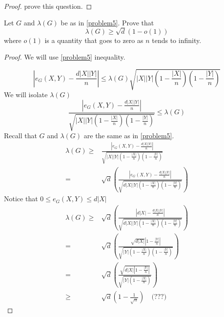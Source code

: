 \documentclass[a4paper, 11pt, oneside]{article}
\newenvironment{problem}[1]
  {\renewcommand\theinnercustomprob{#1}\innercustomprob}
  {\endinnercustomprob}
\newcommand\abs[1]{\left|#1\right|}
\begin{document}
\begin{proof}
 \cite[Lemma 8]{expander} prove this question.
\end{proof}		
 
 \begin{problem}{6}\label{problem6}
 Let $G$ and $\lambda(G)$ be as in \ref{problem5}. Prove that
 \begin{equation*}
 \lambda(G) \geq \sqrt{d}(1-o(1))
\end{equation*}
where $o(1)$ is a quantity that goes to zero as $n$ tends to infinity.
\end{problem}
\begin{proof}
We will use \ref{problem5} inequality.

\begin{equation*}
\left\lvert  e_G(X,Y) - \frac{d\abs{X}\abs{Y}}{n} \right\rvert \leq \lambda(G) \sqrt{  \abs{X}\abs{Y}  \left( 1 - \frac{\abs{X}}{n} \right)\left( 1 - \frac{\abs{Y}}{n} \right)} 
\end{equation*}
We will isolate $\lambda(G)$
\begin{equation*}
\frac{\left\lvert  e_G(X,Y) - \frac{d\abs{X}\abs{Y}}{n} \right\rvert}{\sqrt{  \abs{X}\abs{Y}  \left( 1 - \frac{\abs{X}}{n} \right)\left( 1 - \frac{\abs{Y}}{n} \right)} } \leq \lambda(G)
\end{equation*}
Recall that $G$ and $\lambda(G)$ are the same as in \ref{problem5}. 
\begin{align*}
\lambda(G) \geq &
\frac{\left\lvert  e_G(X,Y) - \frac{d\abs{X}\abs{Y}}{n} \right\rvert}{\sqrt{  \abs{X}\abs{Y}  \left( 1 - \frac{\abs{X}}{n} \right)\left( 1 - \frac{\abs{Y}}{n} \right)} }
\\ = & \sqrt{d}\left(\frac{\left\lvert  e_G(X,Y) - \frac{d\abs{X}\abs{Y}}{n} \right\rvert}{\sqrt{ d \abs{X}\abs{Y}  \left( 1 - \frac{\abs{X}}{n} \right)\left( 1 - \frac{\abs{Y}}{n} \right)} }\right)
\end{align*}
Notice that $0 \leq e_G(X,Y) \leq d \abs{X}$
\begin{align*}
\lambda(G) \geq &
\sqrt{d}\left(\frac{\left\lvert   d \abs{X} - \frac{d\abs{X}\abs{Y}}{n} \right\rvert}{\sqrt{ d \abs{X}\abs{Y}  \left( 1 - \frac{\abs{X}}{n} \right)\left( 1 - \frac{\abs{Y}}{n} \right)} }\right) \\ = &
\sqrt{d}\left(\frac{\sqrt{ d \abs{X}} \left\lvert  1 - \frac{\abs{Y}}{n} \right\rvert}{\sqrt{\abs{Y}  \left( 1 - \frac{\abs{X}}{n} \right)\left( 1 - \frac{\abs{Y}}{n} \right)} }\right)\\ = &
\sqrt{d}\left(\frac{\sqrt{ d \abs{X} \left\lvert  1 - \frac{\abs{Y}}{n} \right\rvert}}{\sqrt{\abs{Y} \left( 1 - \frac{\abs{X}}{n} \right)} }\right) \\ \geq & 
\sqrt{d} \left(1 - 	\frac{1}{\sqrt{n}}\right) \quad \text{(???)}
\end{align*}
\end{proof}		
\end{document}
